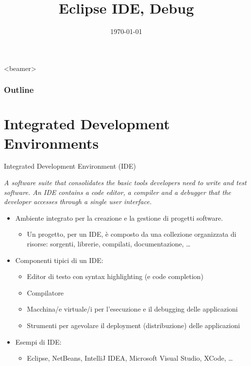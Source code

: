 \documentclass[xcolor=dvipsnames,presentation]{beamer}
\title[{\lab} -- Eclipse, Debug]{Eclipse IDE, Debug}
\date[\today]{\today}
\begin{document}
\frame[label=coverpage]{\titlepage}

\begin{frame}<beamer>
	\frametitle{Outline}
	\tableofcontents[]
\end{frame}

\section{Integrated Development Environments}

\begin{frame}{Integrated Development Environment (IDE)}
	\begin{block}{}
		\emph{A software suite that consolidates the basic tools developers need to write and test software. An IDE contains a code editor, a compiler and a debugger that the developer accesses through a single user interface.}
	\end{block}
	\begin{itemize}
		\item Ambiente integrato per la creazione e la gestione di progetti software.
		\begin{itemize}
			\item Un progetto, per un IDE, è composto da una collezione organizzata di risorse: sorgenti, librerie, compilati, documentazione, \dots
		\end{itemize}
		\item Componenti tipici di un IDE:
		\begin{itemize}
			\item Editor di testo con syntax highlighting (e code completion)
			\item Compilatore
			\item Macchina/e virtuale/i per l'esecuzione e il debugging delle applicazioni
			\item Strumenti per agevolare il deployment (distribuzione) delle applicazioni
		\end{itemize}
		\item Esempi di IDE:
		\begin{itemize}
			\item Eclipse, NetBeans, IntelliJ IDEA, Microsoft Visual Studio, XCode, \dots
		\end{itemize}
	\end{itemize}
\end{frame}
\end{document}

